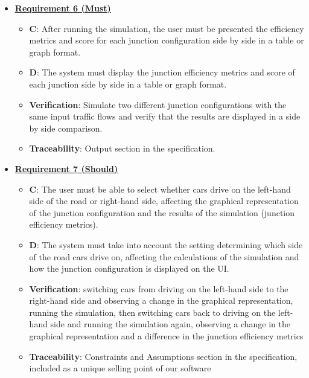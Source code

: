 \documentclass{article}
\begin{document}
\begin{itemize}
    \item \textbf{\underline{Requirement 6 (Must)}}
    \begin{itemize}
        \item \textbf{C}: After running the simulation, the user must be presented the efficiency metrics 
        and score for each junction configuration side by side in a table or graph format.
        \item \textbf{D}: The system must display the junction efficiency metrics and score of each junction 
        side by side in a table or graph format.
        \item \textbf{Verification}: Simulate two different junction configurations with the same 
            input traffic flows and verify that the results are displayed in a side by side comparison.
        \item\textbf{Traceability}: Output section in the specification.
    \end{itemize}

    \item \textbf{\underline{Requirement 7 (Should)}}
    \begin{itemize}
        \item \textbf{C}: The user must be able to select whether cars drive on the left-hand side of 
            the road or right-hand side, affecting the graphical representation of the junction
            configuration and the results of the simulation (junction efficiency metrics).
        \item \textbf{D}: The system must take into account the setting determining which side of
            the road cars drive on, affecting the calculations of the simulation and how 
            the junction configuration is displayed on the UI.
        \item \textbf{Verification}: switching cars from driving on the left-hand side to the 
            right-hand side and observing a change in the graphical representation, running 
            the simulation, then switching cars back to driving on the left-hand side and 
            running the simulation again, observing a change in the graphical representation 
            and a difference in the junction efficiency metrics
        \item\textbf{Traceability}: Constraints and Assumptions section in the specification, included 
            as a unique selling point of our software
    \end{itemize}


\end{itemize}
\end{document}
